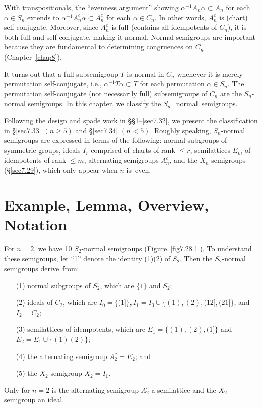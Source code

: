 \documentclass{surv-l}
\numberwithin{equation}{section}
\numberwithin{table}{section}
\numberwithin{figure}{section}
\theoremstyle{plain}
\theoremstyle{definition}
\begin{document}
With transpositionals, the ``evenness argument'' showing
$\alpha^{-1}A_{n}\alpha\subset A_{n}$ for each $\alpha\in S_{n}$
extends to $\alpha^{-1}A_{n}^{c}\alpha\subset A_{n}^{c}$ for each
$\alpha\in C_{n}$. In other words, $A_{n}^{c}$ is (chart)
self-conjugate. Moreover, since $A_{n}^{c}$ is full (contains all
idempotents of $C_{n}$), it is both full and self-conjugate,
making it normal. Normal semigroups are important because they are
fundamental to determining congruences on $C_{n}$
(Chapter~\ref{chap8}).

It turns out that a full subsemigroup $T$ is normal in $C_{n}$
whenever it is merely permutation self-conjugate, i.e.,
$\alpha^{-1}T\alpha\subset T$ for each permutation $\alpha\in
S_{n}$. The permutation self-conjugate (not necessarily full)
subsemigroups of $C_{n}$ are the $S_{n}$-normal semigroups. In
this chapter, we classify the $S_{n^{-}}$ normal~semigroups.

Following the design and spade work in
\S\S\ref{sec7.28}--\ref{sec7.32}, we present the classification in
\S\ref{sec7.33} $(n\geq 5)$ and \S\ref{sec7.34} $(n<5)$. Roughly
speaking, $S_{n}$-normal semigroups are expressed in terms of the
following: normal subgroups of symmetric groups, ideals $I_{r}$
comprised of charts of rank $\leq r$, semilattices $E_{m}$ of
idempotents of rank $\leq m$, alternating semigroups $A_{n}^{c}$,
and the $X_{n}$-semigroups (\S\ref{sec7.29}), which only
appear when $n$ is~even.

\setcounter{section}{27}
\section[Examples, Lemma, Overview, Notation]{Example, Lemma, Overview, Notation}\label{sec7.28}

For $n =2$, we have 10 $S_{2}$-normal semigroups
(Figure~\ref{fig7.28.1}). To understand these semigroups, let ``1''
denote the identity (1)(2) of $S_{2}$. Then the $S_{2}$-normal
semigroups derive~from:
\begin{enumerate}
\item[(1)] normal subgroups of $S_{2}$, which are $\{1\}$ and $S_{2}$;

\item[(2)] ideals of $C_{2}$, which are $I_{0}=\{(1]\},
I_{1}=I_{0}\cup\{(1), (2), (12], (21]\}$, and $I_{2}=C_{2}$;

\item[(3)] semilattices of idempotents, which are $E_{1}=\{(1),(2),(1]\}$ and $E_{2}=E_{1}\cup\{(1)(2)\}$;

\item[(4)] the alternating semigroup $A_{2}^{c}=E_{2}$; and

\item[(5)] the $X_{2}$ semigroup $X_{2}=I_{1}$.
\end{enumerate}
Only for $n =2$ is the alternating semigroup $A_{2}^{c}$ a
semilattice and the $X_{2}$-semigroup an ideal.
\end{document}
